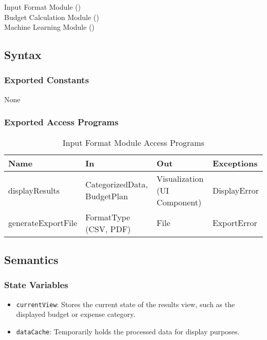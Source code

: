 \documentclass[12pt, titlepage]{article}
\begin{document}
Input Format Module ()\\
Budget Calculation Module ()\\
Machine Learning Module ()\\

\subsection{Syntax}

\subsubsection{Exported Constants}

None

\subsubsection{Exported Access Programs}

\begin{center}
  \begin{table}[H]
    \caption{Input Format Module Access Programs}
\begin{tabular}{p{4cm} p{4cm} p{4cm} p{4cm}}
\hline
\textbf{Name} & \textbf{In} & \textbf{Out} & \textbf{Exceptions} \\
\hline
displayResults & CategorizedData, BudgetPlan & Visualization (UI Component) & DisplayError \\
\hline
generateExportFile & FormatType (CSV, PDF) & File & ExportError \\
\hline
\end{tabular}
\end{table}
\end{center}

\subsection{Semantics}

\subsubsection{State Variables}

\begin{itemize}
    \item \texttt{currentView}: Stores the current state of the results view, such as the displayed budget or expense category.
    \item \texttt{dataCache}: Temporarily holds the processed data for display purposes.
\end{itemize}
\end{document}
